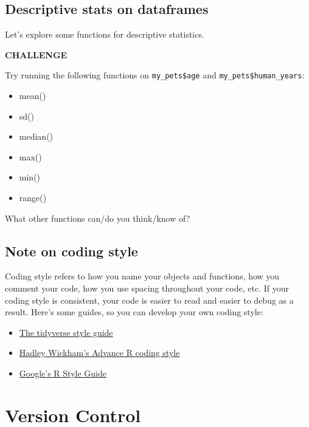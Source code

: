 \documentclass[
]{book}
\begin{document}
\hypertarget{descriptive-stats-on-dataframes}{%
\section{Descriptive stats on dataframes}\label{descriptive-stats-on-dataframes}}

Let's explore some functions for descriptive statistics.

\textbf{CHALLENGE}

Try running the following functions on \texttt{my\_pets\$age} and \texttt{my\_pets\$human\_years}:

\begin{itemize}
\item
  mean()
\item
  sd()
\item
  median()
\item
  max()
\item
  min()
\item
  range()
\end{itemize}

What other functions can/do you think/know of?

\hypertarget{note-on-coding-style}{%
\section{Note on coding style}\label{note-on-coding-style}}

Coding style refers to how you name your objects and functions, how you comment your code, how you use spacing throughout your code, etc. If your coding style is consistent, your code is easier to read and easier to debug as a result. Here's some guides, so you can develop your own coding style:

\begin{itemize}
\item
  \href{https://style.tidyverse.org}{The tidyverse style guide}
\item
  \href{http://adv-r.had.co.nz/Style.html}{Hadley Wickham's Advance R coding style}
\item
  \href{https://google.github.io/styleguide/Rguide.html}{Google's R Style Guide}
\end{itemize}

\hypertarget{version-control}{%
\chapter{Version Control}\label{version-control}}
\end{document}
